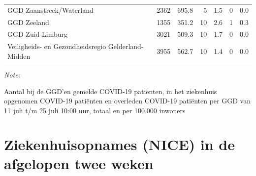 \documentclass[
  english,
  man,floatsintext]{apa6}
\begin{document}
\begin{table}
\begin{threeparttable}
\begin{tabular}{lrrrrrr}
GGD Zaanstreek/Waterland & 2362 & 695.8 & 5 & 1.5 & 0 & 0.0\\
GGD Zeeland & 1355 & 351.2 & 10 & 2.6 & 1 & 0.3\\
GGD Zuid-Limburg & 3021 & 509.3 & 10 & 1.7 & 0 & 0.0\\
Veiligheids- en Gezondheidsregio Gelderland-Midden & 3955 & 562.7 & 10 & 1.4 & 0 & 0.0\\
\bottomrule
\end{tabular}
\begin{tablenotes}
\item \textit{Note: } 
\item Aantal bij de GGD’en gemelde COVID-19 patiënten, in het ziekenhuis opgenomen COVID-19 patiënten en overleden COVID-19 patiënten per GGD van 11 juli t/m 25 juli 10:00 uur, totaal en per 100.000 inwoners
\end{tablenotes}
\end{threeparttable}
\endgroup{}
\end{table}

\newpage

\hypertarget{ziekenhuisopnames-nice-in-de-afgelopen-twee-weken}{%
\section{Ziekenhuisopnames (NICE) in de afgelopen twee weken}\label{ziekenhuisopnames-nice-in-de-afgelopen-twee-weken}}
\end{document}

